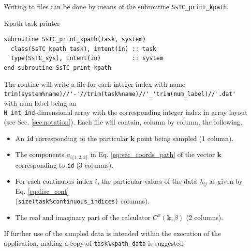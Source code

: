 \documentclass[10pt,a4paper]{article}
\begin{document}
Writing to files can be done by means of the subroutine \verb|SsTC_print_kpath|.
\begin{codebox}{Kpath task printer}
\begin{lstlisting}[caption={Interface of the ``kpath" printer.},captionpos=b]
subroutine SsTC_print_kpath(task, system)
  class(SsTC_kpath_task), intent(in) :: task
  type(SsTC_sys), intent(in)         :: system
end subroutine SsTC_print_kpath
\end{lstlisting}
\end{codebox}
The routine will write a file for each integer index with name \\ \verb|trim(system%name)//'-'//trim(task%name)//'_'trim(num_label)//'.dat'| with num label being an \\ \verb|N_int_ind|-dimensional array with the corresponding integer index in array layout (see Sec. \ref{sec:notation}). Each file will contain, column by column, the following,
\begin{tcolorbox}
\begin{itemize}
\item An \verb|id| corresponding to the particular $\bm{k}$ point being sampled (1 column).
\item The components $a_{i\{1, 2, 3\}}$ in Eq. \eqref{eq:vec_coords_path} of the vector $\bm{k}$ corresponding to \verb|id| (3 columns).
\item For each continuous index $i$, the particular values of the data $\lambda_{ij}$ as given by Eq. \eqref{eq:disc_cont} \\ (\verb|size(task%continuous_indices)| columns).
\item The real and imaginary part of the calculator $C^{\alpha}(\bm{k};\beta)$ (2 columns).
\end{itemize}
\end{tcolorbox}
If further use of the sampled data is intended within the execution of the application, making a copy of \verb|task%kpath_data| is suggested.
\end{document}
